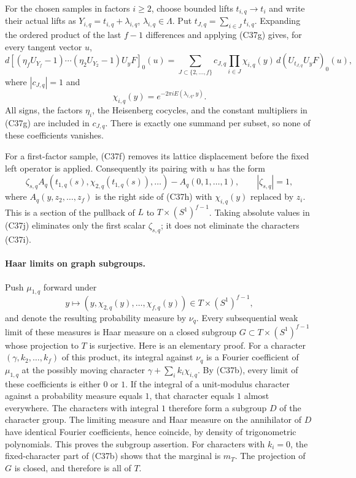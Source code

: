 For the chosen samples in factors $i\ge2$, choose bounded lifts
$t_{i,q}\to t_i$ and write their actual lifts as
$Y_{i,q}=t_{i,q}+\lambda_{i,q}$, $\lambda_{i,q}\in\Lambda$.
Put $t_{J,q}=\sum_{i\in J}t_{i,q}$.  Expanding the ordered product
of the last $f-1$ differences and applying (C37g) gives, for every
tangent vector $u$,
\[
 d\left[
  (\eta_fU_{Y_f}-1)\cdots(\eta_2U_{Y_2}-1)U_yF
       \right]_0(u)
   =\sum_{J\subset\{2,\ldots,f\}}
         c_{J,q}\prod_{i\in J}\chi_{i,q}(y)\,
               d(U_{t_{J,q}}U_yF)_0(u),
 \tag{C37h}
\]
where $|c_{J,q}|=1$ and
\[
       \chi_{i,q}(y)=e^{-2\pi iE(\lambda_{i,q},y)}.
 \tag{C37i}
\]
All signs, the factors $\eta_i$, the Heisenberg cocycles, and the
constant multipliers in (C37g) are included in $c_{J,q}$.
There is exactly one summand per subset, so none of these
coefficients vanishes.

For a first-factor sample, (C37f) removes its lattice displacement
before the fixed left operator is applied.  Consequently its
pairing with $u$ has the form
\[
       \zeta_{s,q}A_q(t_{1,q}(s),\chi_{2,q}(t_{1,q}(s)),\ldots)
                       -A_q(0,1,\ldots,1),
       \qquad |\zeta_{s,q}|=1,
 \tag{C37j}
\]
where $A_q(y,z_2,\ldots,z_f)$ is the right side of (C37h) with
$\chi_{i,q}(y)$ replaced by $z_i$.  This is a section of the
pullback of $L$ to $T\times(S^1)^{f-1}$.  Taking absolute values
in (C37j) eliminates only the first scalar $\zeta_{s,q}$; it does
not eliminate the characters (C37i).

\paragraph{Haar limits on graph subgroups.}
Push $\mu_{1,q}$ forward under
\[
       y\longmapsto(y,\chi_{2,q}(y),\ldots,\chi_{f,q}(y))
          \in T\times(S^1)^{f-1},
\]
and denote the resulting probability measure by $\nu_q$.
Every subsequential weak limit of these measures is Haar measure
on a closed subgroup $G\subset T\times(S^1)^{f-1}$ whose
projection to $T$ is surjective.  Here is an elementary proof.
For a character $(\gamma,k_2,\ldots,k_f)$ of this product, its
integral against $\nu_q$ is a Fourier coefficient of $\mu_{1,q}$
at the possibly moving character
$\gamma+\sum_i k_i\chi_{i,q}$.  By (C37b), every limit of these
coefficients is either $0$ or $1$.  If the integral of a
unit-modulus character against a probability measure equals $1$,
that character equals $1$ almost everywhere.  The characters with
integral $1$ therefore form a subgroup $D$ of the character group.
The limiting measure and Haar measure on the annihilator of $D$
have identical Fourier coefficients, hence coincide, by density
of trigonometric polynomials.  This proves the subgroup assertion.
For characters with $k_i=0$, the fixed-character part of (C37b)
shows that the marginal is $m_T$.  The projection of $G$ is
closed, and therefore is all of $T$.

